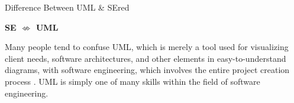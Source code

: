 \vspace{1cm}
\begin{prettyBox}{Difference Between UML \& SE}{red}
 \begin{center}
    \textbf{SE $\not\Leftrightarrow$ UML}
\end{center}

Many people tend to confuse UML, which is merely a tool used for visualizing client needs, software architectures, and other
elements in easy-to-understand diagrams, with software engineering, which involves the entire project creation process . 
UML is simply one of many skills within the field of software engineering.
\end{prettyBox}













